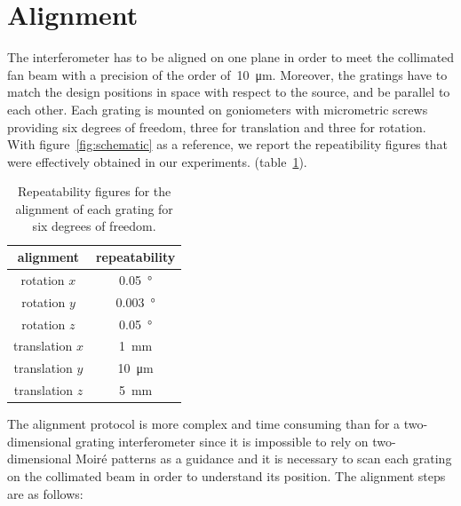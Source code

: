 \section{Alignment}
The interferometer has to be aligned on one plane in order to meet the
collimated fan beam with a precision of the order of~\SI{10}{\micro\metre}.
Moreover, the gratings have to match the design positions in space with
respect to the source, and be parallel to each other.
Each grating is mounted on goniometers with micrometric screws providing six
degrees of freedom, three for translation and three for rotation.
With figure~\ref{fig:schematic} as a reference, we report the repeatibility
figures that were effectively obtained in our experiments.
(table~\ref{tab:allineamento}).
\begin{table}[htb]
    \centering
    \begin{tabular}{*2c}
        \toprule
        alignment & repeatability\\
        \midrule
        rotation $x$ & \SI{0.05}{\degree}\\
        rotation $y$ & \SI{0.003}{\degree}\\
        rotation $z$ & \SI{0.05}{\degree}\\
        translation $x$ & \SI{1}{\milli\metre}\\
        translation $y$ & \SI{10}{\micro\metre}\\
        translation $z$ & \SI{5}{\milli\metre}\\
        \bottomrule
    \end{tabular}
    \caption{Repeatability figures for the alignment of each grating for six
    degrees of freedom.}
    \label{tab:allineamento}
\end{table}
The alignment protocol is more complex and time consuming than for a
two-dimensional grating interferometer since it is impossible to rely on
two-dimensional Moir\'e patterns as a guidance and it is necessary to scan
each grating on the collimated beam in order to understand its position.
The alignment steps are as follows:
